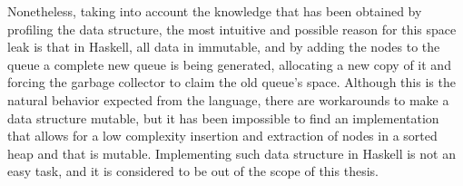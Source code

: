 Nonetheless, taking into account the knowledge that has been obtained by
profiling the data structure, the most intuitive and possible reason for this
space leak is that in Haskell, all data in immutable, and by adding the nodes
to the queue a complete new queue is being generated, allocating a new copy of
it and forcing the garbage collector to claim the old queue's space. Although
this is the natural behavior expected from the language, there are workarounds
to make a data structure mutable, but it has been impossible to find an
implementation that allows for a low complexity insertion and extraction of
nodes in a sorted heap and that is mutable. Implementing such data structure in
Haskell is not an easy task, and it is considered to be out of the scope of
this thesis.\\

\newpage


